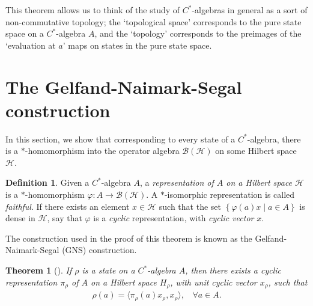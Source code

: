 \documentclass[11pt,a4paper]{report}
\theoremstyle{plain}
\newtheorem{thm}{Theorem}
\theoremstyle{definition}
\newtheorem{defn}{Definition}
\newcommand{\1}{\mathbbm{1}}
\renewcommand{\H}{\mathcal{H}}
\newcommand{\B}{\mathcal{B}}
\newcommand{\BH}{\mathcal{\B(\H)}}
\renewcommand{\phi}{\varphi}
\begin{document}
This theorem allows us to think of the study of $C^\ast$-algebras in general as 
a sort of non-commutative topology; the `topological space' corresponds to the 
pure state space on a $C^\ast$-algebra $A$, and the `topology' corresponds to 
the preimages of the `evaluation at $a$' maps on states in the pure state space.


	
\section{The Gelfand-Naimark-Segal construction}
In this section, we show that corresponding to every state of a 
$C^\ast$-algebra, there is a $\ast$-homomorphism into the operator algebra $\B 
(\H)$ on some Hilbert space $\H$. 

\begin{defn}
	Given a $C^\ast$-algebra $A$, a \emph{representation of $A$ on a Hilbert space $\H$} 
	is a $\ast$-homomorphism $\phi: A \to \BH$. 
	A $\ast$-isomorphic representation is called \emph{faithful}.
	If there exists an element $x\in\H$ such that the set $\left\{\phi(a)x \mid a\in A\right\}$ is dense in $\H$, 
	say that $\phi$ is a \emph{cyclic} representation, with \emph{cyclic vector} $x$.
\end{defn}	
The construction used in the proof of this theorem is known as the Gelfand-Naimark-Segal (GNS)
construction.
\begin{thm}[{\cite[4.5.2]{kadison83}}]\label{thm:gns}
	If $\rho$ is a state on a $C^\ast$-algebra $A$, then there exists a cyclic representation 
	$\pi_\rho$ of $A$ on a Hilbert space ${H}_\rho$, with unit cyclic vector $x_\rho$, such that 
	\begin{align*} 
		\rho(a)= \langle \pi_\rho (a) x_\rho, x_\rho \rangle, ~~~~ \forall a \in A.
	\end{align*}
\end{thm}
\end{document}
